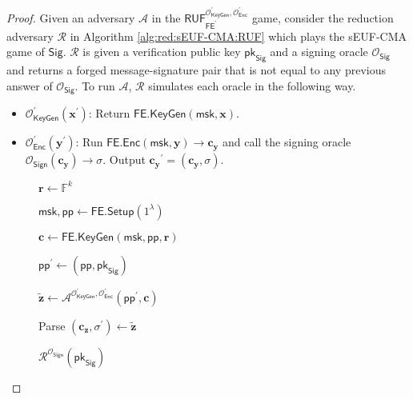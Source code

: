 \begin{proof}

Given an adversary $\mathcal{A}$ in the $\textsf{RUF}^{\mathcal{O}_{\textsf{KeyGen}}^\prime, \mathcal{O}_{\textsf{Enc}}^\prime}_{\textsf{FE}^\prime}$ game, consider the reduction adversary $\mathcal{R}$ in Algorithm \ref{alg:red:sEUF-CMA:RUF} which plays the \textsf{sEUF-CMA} game of $\textsf{Sig}$. $\mathcal{R}$ is given a verification public key $\textsf{pk}_{\textsf{Sig}}$ and a signing oracle $\mathcal{O}_{\textsf{Sig}}$ and returns a forged message-signature pair that is not equal to any previous answer of $\mathcal{O}_{\textsf{Sig}}$. To run $\mathcal{A}$, $\mathcal{R}$ simulates each oracle in the following way.

\begin{itemize}
	\item $\mathcal{O}_{\textsf{KeyGen}}^\prime(\mathbf{x}^\prime)$: Return $\textsf{FE.KeyGen}(\textsf{msk}, \mathbf{x})$.

	\item $\mathcal{O}_{\textsf{Enc}}^\prime(\mathbf{y}^\prime)$: Run $\textsf{FE.Enc}(\textsf{msk}, \mathbf{y}) \to \mathbf{c_y}$ and call the signing oracle $\mathcal{O}_{\textsf{Sign}}(\mathbf{c_y}) \to \sigma$. Output $\mathbf{c_y}^\prime = (\mathbf{c_y}, \sigma)$.
\end{itemize}

\begin{figure}[h]
\centering
	
	\begin{minipage}[t]{0.5\linewidth}
	\centering
	\begin{algorithm}[H]
	\caption{$\mathcal{R}^{\mathcal{O}_{\textsf{Sign}}}( \textsf{pk}_{\textsf{Sig}} )$}
	\label{alg:red:sEUF-CMA:RUF}
	\begin{algorithmic}[1]

		\State $\mathbf{r} \gets \mathbb{F}^k$

		\State $\textsf{msk}, \textsf{pp} \gets \textsf{FE.Setup}(1^\lambda)$

		\State $\mathbf{c} \gets \textsf{FE.KeyGen}(\textsf{msk}, \textsf{pp}, \mathbf{r})$

		\State $\textsf{pp}^\prime \gets (\textsf{pp}, \textsf{pk}_{\textsf{Sig}})$

		\State $\mathbf{\tilde{z}} \gets {\mathcal{A}}^{\mathcal{O}_{\textsf{KeyGen}}^\prime, \mathcal{O}_{\textsf{Enc}}^\prime } (\textsf{pp}^\prime, \mathbf{c})$ \label{alg:red:sEUF-CMA:RUF:A}

		\State Parse $(\mathbf{c_z}, \sigma^\prime) \gets \mathbf{\tilde{z}}$


\end{algorithmic}
\end{algorithm}
\end{minipage}
\end{figure}
\end{proof}

